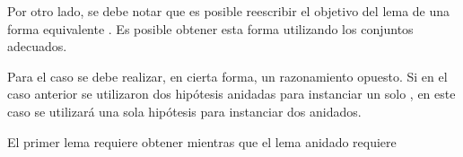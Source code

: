 \documentclass[]{report}
\begin{document}
	Por otro lado, se debe notar que es posible reescribir el objetivo del lema de una forma equivalente
	\AgdaSpace{}%
	\AgdaSpace{}%
	\AgdaSpace{}%
	\AgdaSymbol{\{}\AgdaSpace{}%
	\AgdaSymbol{\}}\AgdaSpace{}%
	\AgdaSpace{}%
	\AgdaSpace{}%
	\AgdaSpace{}%
	\AgdaSpace{}%
	\AgdaSymbol{(}\AgdaSpace{}%
	\AgdaSpace{}%
	\AgdaSymbol{(}\AgdaSpace{}%
	\AgdaSpace{}%
	\AgdaSymbol{\{}\AgdaSpace{}%
	\AgdaSymbol{\}}\AgdaSpace{}%
	\AgdaSpace{}%
	\AgdaSpace{}%
	\AgdaSpace{}%
	\AgdaSpace{}%
	\AgdaSymbol{)}\AgdaSpace{}%
	\AgdaSpace{}%
	\AgdaSymbol{)}
	. Es posible obtener esta forma utilizando los conjuntos adecuados.
	
	
	Para el caso  se debe realizar, en cierta forma, un razonamiento opuesto.
	Si en el caso anterior se utilizaron dos hipótesis anidadas para instanciar un solo , en este caso se utilizará una sola hipótesis para instanciar dos  anidados.
	
	El primer lema requiere obtener
	\AgdaSpace{}%
	\AgdaSpace{}%
	\AgdaSymbol{(}\AgdaSpace{}%
	\AgdaSpace{}%
	\AgdaSpace{}%
	\AgdaSpace{}%
	\AgdaSymbol{)}\AgdaSpace{}%
	\AgdaSpace{}%
	\AgdaSymbol{(}\AgdaSpace{}%
	\AgdaSpace{}%
	\AgdaSpace{}%
	\AgdaSymbol{))}
	mientras que el lema anidado requiere
	\AgdaSpace{}%
	\AgdaSpace{}%
	\AgdaSpace{}%
	\AgdaSpace{}%
	\AgdaSpace{}%
	\AgdaSpace{}%
	\AgdaSpace{}%
	\AgdaSymbol{(}\AgdaSpace{}%
	\AgdaSpace{}%
	\AgdaSymbol{(}\AgdaSpace{}%
	\AgdaSpace{}%
	\AgdaSpace{}%
	\AgdaSpace{}%
	\AgdaSymbol{)}\AgdaSpace{}%
	\AgdaSpace{}%
	\AgdaSymbol{(}\AgdaSpace{}%
	\AgdaSpace{}%
	\AgdaSpace{}%
	\AgdaSymbol{))}
	
\end{document}
